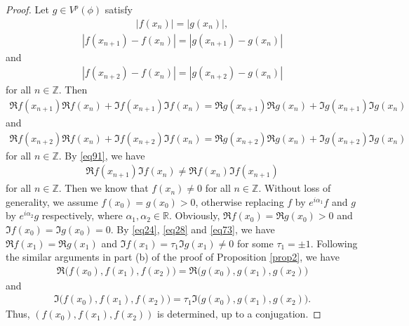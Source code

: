 \documentclass[10pt,a4paper]{amsart}
\newcommand{\R}{\mathbb{R}}
\newcommand{\Z}{\mathbb{Z}}
\begin{document}
\begin{proof}
	Let $g\in V^p(\phi)$ satisfy 
	\begin{align}\label{eq24}
		|f(x_n)| = |g(x_n)|, 
	\end{align}
	\begin{align*}
		|f(x_{n+1}) - f(x_n)| = |g(x_{n+1}) - g(x_n)|
	\end{align*}
	and
	\begin{align*}
		|f(x_{n+2}) - f(x_n)| = |g(x_{n+2}) - g(x_n)|
	\end{align*}
	for all $n\in \Z$.  
	Then
	\begin{align}\label{eq28}
		\Re f(x_{n+1})   \Re f(x_{n})    +  \Im f(x_{n+1})  \Im f(x_{n}) 
		=  \Re g(x_{n+1})   \Re g(x_{n}  )  +  \Im g(x_{n+1})   \Im g(x_{n}) 
	\end{align}
	and
	\begin{align}\label{eq29}
		\Re f(x_{n+2})   \Re f(x_{n})    +  \Im f(x_{n+2})  \Im f(x_{n}) 
		=  \Re g(x_{n+2})   \Re g(x_{n}  )  +  \Im g(x_{n+2})   \Im g(x_{n}) 
	\end{align}
	for all $n\in \Z$.
	By \eqref{eq91}, we have
	\begin{align}\label{eq73}
		\Re f(x_{n+1}) \Im f(x_{n}) \ne \Re f(x_{n}) \Im f(x_{n+1})
	\end{align}
	for all $n\in \Z$.
	Then we know that $f(x_n) \ne 0$ for all $n\in \Z$. Without loss of generality, we assume $f(x_0)=g(x_0)>0$, otherwise replacing $f$ by $e^{i\alpha_1}f$ and $g$ by $e^{i\alpha_2}g$ respectively, where $\alpha_1, \alpha_2\in \R$.
	Obviously, $\Re f(x_0) = \Re g(x_0) > 0$ and $ \Im f(x_0) = \Im g(x_0) =0$. By \eqref{eq24}, \eqref{eq28} and \eqref{eq73}, we have $\Re f(x_1) =  \Re g(x_1)$ and $ \Im f(x_1)= \tau_1 \Im g(x_1) \ne 0$ for some $\tau_1= \pm 1$. Following the similar arguments in part (b) of the proof of Proposition \ref{prop2}, we have
	\begin{align*}
		\Re\big(f(x_{0}), f(x_{1}), f(x_{2})\big) = \Re\big (g(x_{0}), g(x_{1}), g(x_{2})\big)
	\end{align*}
	and
	\begin{align*}
		\Im \big(f(x_{0}), f(x_{1}), f(x_{2}))= \tau_1 \Im (g(x_{0}), g(x_{1}), g(x_{2})\big).
	\end{align*}
	Thus, $(f(x_0), f(x_1), f(x_2))$ is determined, up to a conjugation.
	

\end{proof}
\end{document}

